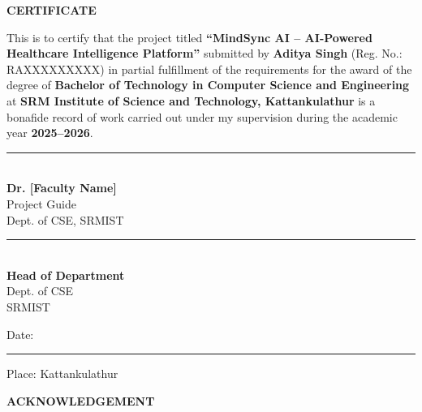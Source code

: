 \documentclass[12pt,a4paper]{report}
\begin{document}
\newpage
\thispagestyle{empty}
\begin{center}
    {\Large\textbf{\textcolor{srmblue}{CERTIFICATE}}}\\[1.5cm]
\end{center}

This is to certify that the project titled \textbf{``MindSync AI -- AI-Powered Healthcare Intelligence Platform''} submitted by \textbf{Aditya Singh} (Reg. No.: RAXXXXXXXXX) in partial fulfillment of the requirements for the award of the degree of \textbf{Bachelor of Technology in Computer Science and Engineering} at \textbf{SRM Institute of Science and Technology, Kattankulathur} is a bonafide record of work carried out under my supervision during the academic year \textbf{2025--2026}.

\vspace{3cm}

\begin{minipage}[t]{0.45\textwidth}
    \begin{flushleft}
        \rule{5cm}{0.5pt}\\
        \textbf{Dr. [Faculty Name]}\\
        Project Guide\\
        Dept. of CSE, SRMIST
    \end{flushleft}
\end{minipage}
\hfill
\begin{minipage}[t]{0.45\textwidth}
    \begin{flushright}
        \rule{5cm}{0.5pt}\\
        \textbf{Head of Department}\\
        Dept. of CSE\\
        SRMIST
    \end{flushright}
\end{minipage}

\vspace{3cm}
\begin{center}
    Date: \rule{3cm}{0.5pt} \hspace{2cm} Place: Kattankulathur
\end{center}

\newpage
\thispagestyle{empty}
\begin{center}
    {\Large\textbf{\textcolor{srmblue}{ACKNOWLEDGEMENT}}}\\[1.5cm]
\end{center}
\end{document}
